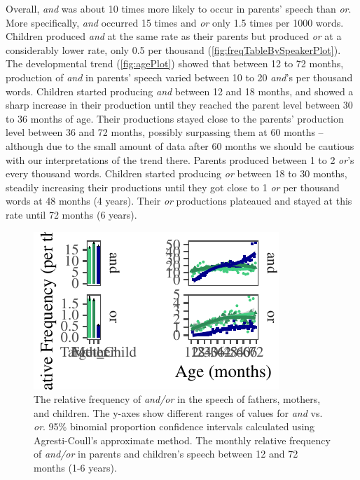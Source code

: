 \documentclass[,man,floatsintext]{apa6}
\begin{document}
Overall, \emph{and} was about 10 times more likely to occur in parents' speech than \emph{or}. More specifically, \emph{and} occurred 15 times and \emph{or} only 1.5 times per 1000 words. Children produced \emph{and} at the same rate as their parents but produced \emph{or} at a considerably lower rate, only 0.5 per thousand (\ref{fig:freqTableBySpeakerPlot}). The developmental trend (\ref{fig:agePlot}) showed that between 12 to 72 months, production of \emph{and} in parents' speech varied between 10 to 20 \emph{and}'s per thousand words. Children started producing \emph{and} between 12 and 18 months, and showed a sharp increase in their production until they reached the parent level between 30 to 36 months of age. Their productions stayed close to the parents' production level between 36 and 72 months, possibly surpassing them at 60 months -- although due to the small amount of data after 60 months we should be cautious with our interpretations of the trend there. Parents produced between 1 to 2 \emph{or}'s every thousand words. Children started producing \emph{or} between 18 to 30 months, steadily increasing their productions until they got close to 1 \emph{or} per thousand words at 48 months (4 years). Their \emph{or} productions plateaued and stayed at this rate until 72 months (6 years).

\begin{figure}[tb]

{\centering \includegraphics{figs/bySpeakerAgePlots-1} 

}

\caption{The relative frequency of \textit{and/or} in the speech of fathers, mothers, and children. The y-axes show different ranges of values for \textit{and} vs. \textit{or}. 95\% binomial proportion confidence intervals calculated using Agresti-Coull's approximate method. The monthly relative frequency of \textit{and/or} in parents and children's speech between 12 and 72 months (1-6 years).}\label{fig:bySpeakerAgePlots}
\end{figure}
\end{document}
